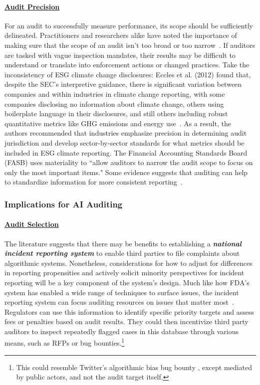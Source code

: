 \documentclass[sigconf]{acmart}
\begin{document}
\paragraph{\underline{Audit Precision}} For an audit to successfully measure performance, its scope should be sufficiently delineated. Practitioners and researchers alike have noted the importance of making sure that the scope of an audit isn’t too broad or too narrow~\cite{karapetrovic2001audit}. If auditors are tasked with vague inspection mandates, their results may be difficult to understand or translate into enforcement actions or changed practices. Take the inconsistency of ESG climate change disclosures: Eccles et al. (2012) found that, despite the SEC’s interpretive guidance, there is significant variation between companies and within industries in climate change reporting, with some companies disclosing no information about climate change, others using boilerplate language in their disclosures, and still others including robust quantitative metrics like GHG emissions and energy use~\cite{eccles2012need}. As a result, the authors recommended that industries emphasize precision in determining audit jurisdiction and develop sector-by-sector standards for what metrics should be included in ESG climate reporting. The Financial Accounting Standards Board (FASB) uses materiality to “allow auditors to narrow the audit scope to focus on only the most important items." Some evidence suggests that auditing can help to standardize information for more consistent reporting~\cite{haapamaki2019research}.
 
\subsubsection{Implications for AI Auditing} 

\paragraph{\underline{Audit Selection}} The literature suggests that there may be benefits to establishing a \textbf{\textit{national incident reporting system}} to enable third parties to file complaints about algorithmic systems. Nonetheless, considerations for how to adjust for differences in reporting propensities and actively solicit minority perspectives for incident reporting will be a key component of the system's design. Much like how FDA’s system has enabled a wide range of techniques to surface issues, the incident reporting system can focus auditing resources on issues that matter most~\cite{tatonetti2012novel}. Regulators can use this information to identify specific priority targets and assess fees or penalties based on audit results. They could then incentivize third party auditors to inspect repeatedly flagged cases in this database through various means, such as RFPs or bug bounties.\footnote{This could resemble Twitter's algorithmic bias bug bounty \cite{twitter1}, except mediated by public actors, and not the audit target itself.}
\end{document}
